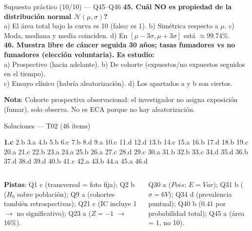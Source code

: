 \documentclass[aspectratio=169,8pt]{beamer}
\begin{document}
\begin{frame}{Supuesto pr\'actico (10/10) --- Q45--Q46}
  \scriptsize
  \textbf{45. \textquestiondown{}Cu\'al NO es propiedad de la distribuci\'on normal $\mathcal N(\mu,\sigma)$?}\\
  a) El \'area total bajo la curva es 10 (falso: es 1).\;
  b) Sim\'etrica respecto a $\mu$.\;
  c) Moda, mediana y media coinciden.\;
  d) En $[\mu-3\sigma,\mu+3\sigma]$ est\'a $\approx99.74\%$.\\[3pt]
  \textbf{46. Muestra libre de c\'ancer seguida 30 a\~nos; tasas fumadores vs no fumadores (elecci\'on voluntaria). Es estudio:}\\
  a) Prospectivo (hacia adelante).\;
  b) De cohorte (expuestos/no expuestos seguidos en el tiempo).\\
  c) Ensayo cl\'inico (habr\'ia aleatorizaci\'on).\;
  d) Los apartados a y b son ciertos.\\[6pt]
  \begin{tcolorbox}[tealbox]
    \scriptsize\textbf{Nota}: Cohorte prospectiva observacional: el investigador no asigna exposici\'on (fumar), solo observa. No es ECA porque no hay aleatorizaci\'on.
  \end{tcolorbox}
\end{frame}

\begin{frame}{Soluciones --- T02 (46 \'items)}
  \scriptsize
  \begin{tcolorbox}[formulabox,title=Clave de respuestas]
    \footnotesize
    \textbf{1.c}\; 2.b\; 3.a\; 4.b\; 5.b\; 6.c\; 7.b\; 8.d\; 9.a\; 10.c\; 11.d\; 12.d\; 13.b\; 14.c\; 15.a\; 16.b\; 17.d\; 18.b\; 19.c\; 20.a\; 21.c\; 22.b\; 23.a\; 24.a\; 25.b\; 26.a\; 27.c\; 28.d\; 29.c\; 30.a\; 31.b\; 32.b\; 33.c\; 34.d\; 35.d\; 36.b\; 37.d\; 38.d\; 39.d\; 40.b\; 41.c\; 42.a\; 43.b\; 44.a\; 45.a\; 46.d
  \end{tcolorbox}
  \vspace{0.3em}
  \begin{columns}[T,onlytextwidth]
      \begin{tcolorbox}[tealbox]
        \scriptsize
        \textbf{Pistas}: Q1 c (transversal = foto fija); Q2 b ($H_0$ sobre poblaci\'on); Q9 a (cohortes tambi\'en retrospectivas); Q21 c (IC incluye 1 $\to$ no significativo); Q23 a ($Z=-1$ $\to$ 16\%).
      \end{tcolorbox}
      \begin{tcolorbox}[infobox]
        \scriptsize
        Q30 a ($Pois$: $E=Var$); Q31 b ($\sigma=6V$); Q34 d (prevalencia puntual); Q40 b ($0.41$ por probabilidad total); Q45 a (\'area = 1, no 10).
      \end{tcolorbox}
  \end{columns}
\end{frame}
\end{document}
